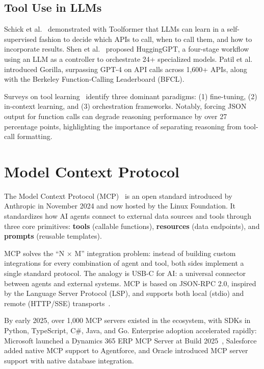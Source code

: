 \documentclass[12pt,a4paper]{report}
\begin{document}
\subsection{Tool Use in LLMs}

Schick et al.~\cite{schick2023toolformer} demonstrated with Toolformer that LLMs can learn in a self-supervised fashion to decide which APIs to call, when to call them, and how to incorporate results. Shen et al.~\cite{shen2023hugginggpt} proposed HuggingGPT, a four-stage workflow using an LLM as a controller to orchestrate 24+ specialized models. Patil et al.~\cite{patil2024gorilla} introduced Gorilla, surpassing GPT-4 on API calls across 1,600+ APIs, along with the Berkeley Function-Calling Leaderboard (BFCL).

Surveys on tool learning~\cite{toollearningsurvey2025} identify three dominant paradigms: (1) fine-tuning, (2) in-context learning, and (3) orchestration frameworks. Notably, forcing JSON output for function calls can degrade reasoning performance by over 27 percentage points, highlighting the importance of separating reasoning from tool-call formatting.

\section{Model Context Protocol}

The Model Context Protocol (MCP)~\cite{mcp2024} is an open standard introduced by Anthropic in November 2024 and now hosted by the Linux Foundation. It standardizes how AI agents connect to external data sources and tools through three core primitives: \textbf{tools} (callable functions), \textbf{resources} (data endpoints), and \textbf{prompts} (reusable templates).

MCP solves the ``N $\times$ M'' integration problem: instead of building custom integrations for every combination of agent and tool, both sides implement a single standard protocol. The analogy is USB-C for AI: a universal connector between agents and external systems. MCP is based on JSON-RPC 2.0, inspired by the Language Server Protocol (LSP), and supports both local (stdio) and remote (HTTP/SSE) transports~\cite{mcpspec}.

By early 2025, over 1,000 MCP servers existed in the ecosystem, with SDKs in Python, TypeScript, C\#, Java, and Go. Enterprise adoption accelerated rapidly: Microsoft launched a Dynamics 365 ERP MCP Server at Build 2025~\cite{msdynamics2025}, Salesforce added native MCP support to Agentforce, and Oracle introduced MCP server support with native database integration.
\end{document}

